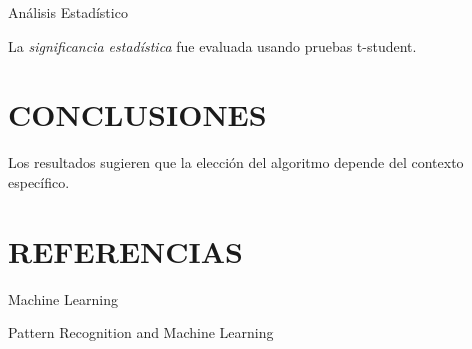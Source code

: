 \documentclass[12pt,a4paper]{article}
\begin{document}
Análisis Estadístico

La \textit{significancia estadística} fue evaluada usando pruebas t-student.


\section{CONCLUSIONES}

Los resultados sugieren que la elección del algoritmo depende del contexto específico.


\section{REFERENCIAS}

\cite{Mitchell1997} Machine Learning

\cite{Bishop2006} Pattern Recognition and Machine Learning
\end{document}
